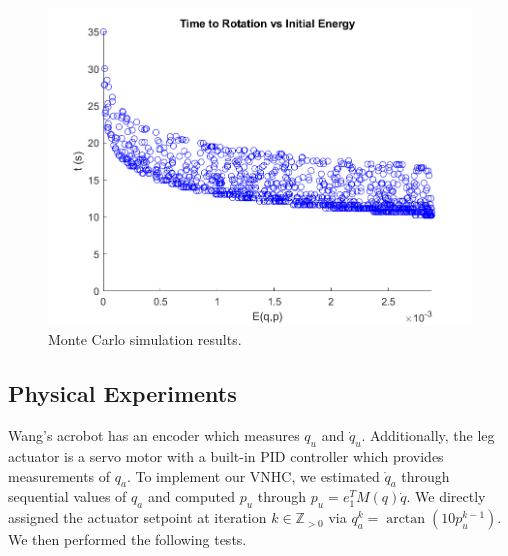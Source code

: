 \documentclass[journal,twoside,web]{ieeecolor}
\begin{document}
\begin{figure}[]
    \centering
    \includegraphics[width=0.7\linewidth]{acrobot_mc.png}
    \caption{Monte Carlo simulation results.}
    \label{fig:acrobot-mc}
\end{figure}

\subsection{Physical Experiments}

Wang's acrobot has an encoder which measures \(q_u\) and
\(\dot{q}_u\).
Additionally, the leg actuator is a servo motor with a built-in PID controller
which provides measurements of \(q_a\).
To implement our VNHC, we estimated \(\dot{q}_a\) through sequential values of
\(q_a\) and computed \(p_u\) through \(p_u = e_1^T M(q) \dot{q}\).
We directly assigned the actuator setpoint at iteration \(k \in \mathbb{Z}_{> 0}\)
via \(q_a^{k} = \arctan(10 p_u^{k-1})\).
We then performed the following tests.
\end{document}
